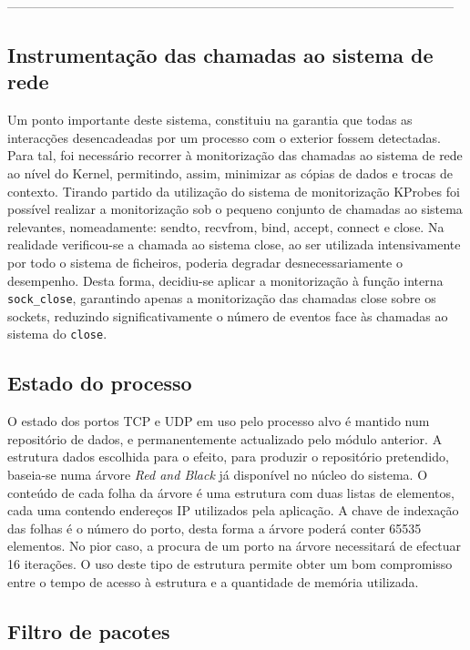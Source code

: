 ---------------------------------------------------------------------------------------------------------


\subsection*{Instrumentação das chamadas ao sistema de rede}
\label{sub:mon_syscalls}

Um ponto importante deste sistema, constituiu na garantia que todas as interacções desencadeadas por um processo com o exterior fossem detectadas. Para tal, foi necessário recorrer à monitorização das chamadas ao sistema de rede ao nível do Kernel, permitindo, assim, minimizar as cópias de dados e trocas de contexto. Tirando partido da utilização do sistema de monitorização KProbes foi possível realizar a monitorização sob o pequeno conjunto de chamadas ao sistema relevantes, nomeadamente: sendto, recvfrom, bind, accept, connect e close.
 Na realidade verificou-se a chamada ao sistema close, ao ser utilizada intensivamente por todo o sistema de ficheiros, poderia degradar desnecessariamente o desempenho. Desta forma, decidiu-se aplicar a monitorização à função interna \texttt{sock\_close}, garantindo apenas a monitorização das chamadas close sobre os sockets, reduzindo significativamente o número de eventos face às chamadas ao sistema do \texttt{close}.

\subsection*{Estado do processo}
\label{sub:data_repository}

O estado dos portos TCP e UDP em uso pelo processo alvo é mantido num repositório de dados, e permanentemente actualizado pelo módulo anterior. 
 A estrutura dados escolhida para o efeito, para produzir o repositório pretendido, baseia-se numa árvore \textit{Red and Black} já disponível no núcleo do sistema. O conteúdo de cada folha da árvore é uma estrutura com duas listas de elementos, cada uma contendo endereços IP utilizados pela aplicação. A chave de indexação das folhas é o número do porto, desta forma a árvore poderá conter 65535 elementos. No pior caso, a procura de um porto na árvore necessitará de efectuar 16 iterações.
  O uso deste tipo de estrutura permite obter um bom compromisso entre o tempo de acesso à estrutura e a quantidade de memória utilizada.


\subsection*{Filtro de pacotes}
\label{sub:packet_filter}

